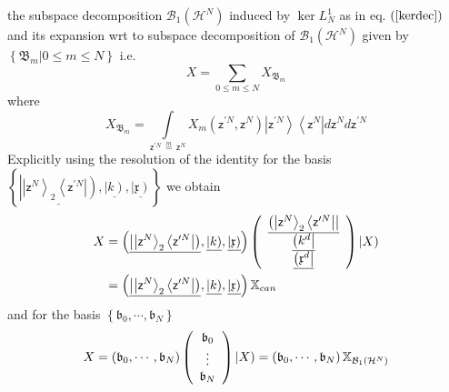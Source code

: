 \documentclass[aps,preprint]{revtex4}%
\begin{document}
the subspace decomposition $\mathcal{B}_{1}\left(  \mathcal{H}^{N}\right)  $
induced by $\ker L_{N}^{1}$ as in eq. $\left(  \ref{kerdec}\right)  $ and its
expansion wrt to subspace decomposition of $\mathcal{B}_{1}\left(
\mathcal{H}^{N}\right)  $ given by $\left\{  \mathfrak{B}_{m}|0\leq m\leq
N\right\}  $ i.e.
\begin{equation}
X=\sum_{0\leq m\leq N}X_{\mathfrak{B}_{m}}%
\end{equation}
where
\begin{equation}
X_{\mathfrak{B}_{m}}=%
{\displaystyle\int\limits_{\mathsf{z}^{\prime N}\,\overset{m}{=}%
\,\mathsf{z}^{N}}}
X_{m}\left(  \mathsf{z}^{\prime N},\mathsf{z}^{N}\right)  \left\vert
\mathsf{z}^{\prime N}\right\rangle \left\langle \mathsf{z}^{N}\right\vert
d\mathsf{z}^{N}d\mathsf{z}^{\prime N}%
\end{equation}
Explicitly using the resolution of the identity for the basis $\left\{
\underline{\left\vert \left\vert \mathsf{z}^{N}\right\rangle _{2}\left\langle
\mathsf{z}^{\prime N}\right\vert \right)  },\underline{\left\vert k\right)
},\underline{\left\vert \mathfrak{x}\right)  }\right\}  $ we obtain%
\begin{align}
X  &  =\left(  \underline{\left\vert \left\vert \mathsf{z}^{N}\right\rangle
_{2}\left\langle \mathsf{z}^{\prime N}\right\vert \right)  },\underline
{\left\vert k\right)  },\underline{\left\vert \mathfrak{x}\right)  }\right)
\left(
\begin{array}
[c]{c}%
\underline{\left(  \left\vert \mathsf{z}^{N}\right\rangle _{2}\left\langle
\mathsf{z}^{\prime N}\right\vert \right\vert }\\
\underline{\left(  k^{d}\right\vert }\\
\underline{\left(  \mathfrak{x}^{d}\right\vert }%
\end{array}
\right)  \left\vert X\right) \nonumber\\
&  =\left(  \underline{\left\vert \left\vert \mathsf{z}^{N}\right\rangle
_{2}\left\langle \mathsf{z}^{\prime N}\right\vert \right)  },\underline
{\left\vert k\right)  },\underline{\left\vert \mathfrak{x}\right)  }\right)
\mathbb{X}_{can}%
\end{align}
and for the basis $\left\{  \mathfrak{b}_{0},\cdots,\mathfrak{b}_{N}\right\}
$%
\begin{equation}
X=\left(  \mathfrak{b}_{0},\cdots,\mathfrak{b}_{N}\right)  \left(
\begin{array}
[c]{c}%
\mathfrak{b}_{0}\\
\vdots\\
\mathfrak{b}_{N}%
\end{array}
\right)  \left\vert X\right)  =\left(  \mathfrak{b}_{0},\cdots,\mathfrak{b}%
_{N}\right)  \mathbb{X}_{\mathcal{B}_{1}\left(  \mathcal{H}^{N}\right)  }%
\end{equation}
\end{document}
